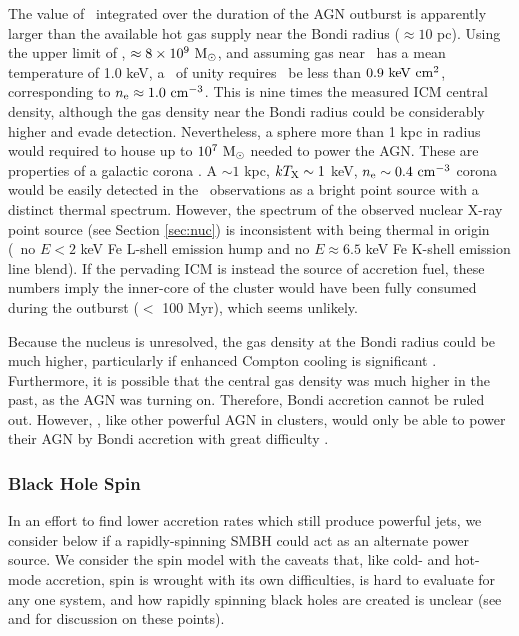 \documentclass[iop]{emulateapj}
\begin{document}
The value of \dmb\ integrated over the duration of the AGN outburst is
apparently larger than the available hot gas supply near the Bondi
radius ($\approx 10$ pc). Using the upper limit of \mbh, $\approx 8
\times 10^9 ~\rm{M_{\odot}}$, and assuming gas near \rbon\ has a mean
temperature of 1.0 keV, a \dmb\ of unity requires \kbon\ be less than
$0.9 ~\rm{\mbox{\ensuremath{\rm{keV}}}~\ensuremath{\rm{\mbox{\ensuremath{\rm{cm}}}^2}}}$, corresponding to $n_{\rm{e}} \approx 1.0 ~\rm{\mbox{\ensuremath{\rm{cm}}}^{-3}}$. This is nine
times the measured ICM central density, although the gas density near
the Bondi radius could be considerably higher and evade detection.
Nevertheless, a sphere more than 1 kpc in radius would required to
house up to $10^7 ~\rm{M_{\odot}}$ needed to power the AGN. These are
properties of a galactic corona \citep{coronae}. A $\sim 1$ kpc, $kT_{\rm{X}}
\sim 1$ keV, $n_{\rm{e}} \sim 0.4 ~\rm{\mbox{\ensuremath{\rm{cm}}}^{-3}}$ corona would be easily detected
in the \cxo\ observations as a bright point source with a distinct
thermal spectrum. However, the spectrum of the observed nuclear X-ray
point source (see Section \ref{sec:nuc}) is inconsistent with being
thermal in origin (\ie\ no $E < 2$ keV Fe L-shell emission hump and no
$E \approx 6.5$ keV Fe K-shell emission line blend). If the pervading
ICM is instead the source of accretion fuel, these numbers imply the
inner-core of the cluster would have been fully consumed during the
outburst ($<$ 100 Myr), which seems unlikely.

Because the nucleus is unresolved, the gas density at the Bondi radius
could be much higher, particularly if enhanced Compton cooling is
significant \citep[\eg][]{2010MNRAS.402.1561R}. Furthermore, it is
possible that the central gas density was much higher in the past, as
the AGN was turning on. Therefore, Bondi accretion cannot be ruled
out. However, \rbs, like other powerful AGN in clusters, would only be
able to power their AGN by Bondi accretion with great difficulty
\citep{rafferty06, minaspin}.

\subsubsection{Black Hole Spin}

In an effort to find lower accretion rates which still produce
powerful jets, we consider below if a rapidly-spinning SMBH could act
as an alternate power source. We consider the spin model with the
caveats that, like cold- and hot-mode accretion, spin is wrought with
its own difficulties, is hard to evaluate for any one system, and how
rapidly spinning black holes are created is unclear (see
\citealt{msspin} and \citealt{minaspin} for discussion on these
points).
\end{document}
